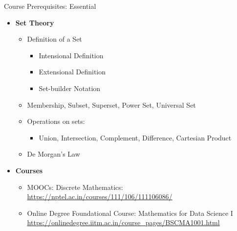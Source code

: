 \documentclass[aspectratio=169, xcolor=dvipsnames]{beamer}
\begin{document}
\begin{frame}{Course Prerequisites: Essential}
    \begin{itemize}[<+->]
        \item \textbf{Set Theory}
        \begin{itemize}
            \item Definition of a Set
            \begin{itemize}
                \item[$\triangleright$] Intensional Definition
                \item[$\triangleright$] Extensional Definition
                \item[$\triangleright$] Set-builder Notation
            \end{itemize}
            \item Membership, Subset, Superset, Power Set, Universal Set
            \item Operations on sets:
            \begin{itemize}
                \item[$\triangleright$] Union, Intersection, Complement, Difference, Cartesian Product
            \end{itemize}
            \item De Morgan's Law
        \end{itemize}
        \item \textbf{Courses}
        \begin{itemize}
            \item[$\triangleright$] MOOCs: Discrete Mathematics: \\
            \url{https://nptel.ac.in/courses/111/106/111106086/}
            \item[$\triangleright$] Online Degree Foundational Course: Mathematics for Data Science I \\
            \url{https://onlinedegree.iitm.ac.in/course_pages/BSCMA1001.html}
        \end{itemize}
    \end{itemize}
\end{frame}
\end{document}
